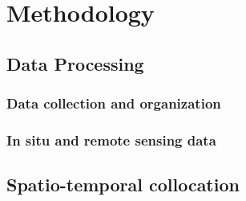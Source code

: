 
\chapter{Methodology} %

\label{Chapter4} %


\section{Data Processing}

\subsection{Data collection and organization}

\subsection{In situ and remote sensing data}



\cite{Stammer2017}


\section{Spatio-temporal collocation}



